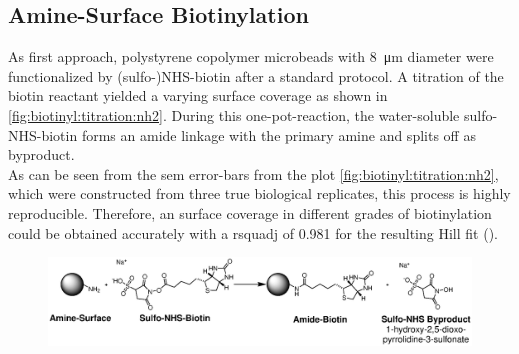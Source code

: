 \subsection{Amine-Surface Biotinylation}
As first approach, polystyrene copolymer microbeads with \SI{8}{\micro\meter} diameter were functionalized by (sulfo-)NHS-biotin after a standard protocol. A titration of the biotin reactant yielded a varying surface coverage as shown in \cref{fig:biotinyl:titration:nh2}. During this one-pot-reaction, the water-soluble sulfo-NHS-biotin forms an \gls{amide} linkage with the primary \gls{amine} and  splits off as byproduct.\\
As can be seen from the \gls{sem} error-bars from the plot \ref{fig:biotinyl:titration:nh2}, which were constructed from three true biological replicates, this process is highly reproducible. Therefore, an surface coverage in different grades of biotinylation could be obtained accurately with a \gls{rsquadj} of \num{0.981} for the resulting Hill fit (\orangedash).

\begin{figure}[h]
	\centering
	\includegraphics[width=\linewidth]{./Ressources/Chemistry/Sulfo-NHS.eps}
	\label{fig:Chem:NH2-NHS}
\end{figure}

\clearpage

